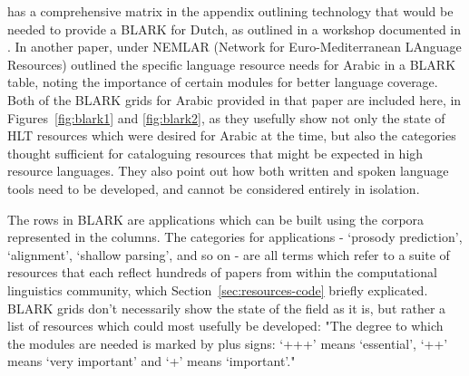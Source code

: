 \citet{krauwer2003basic} has a comprehensive matrix in the appendix outlining technology that would be needed to provide a BLARK for Dutch, as outlined in a workshop documented in \citet{binnenpoorte2002towards}. In another paper, \citet{maegaard2006blark} under NEMLAR (Network  for  Euro-Mediterranean  LAnguage  Resources) outlined the specific language resource needs for Arabic in a BLARK table, noting the importance of certain modules for better language coverage. Both of the BLARK grids for Arabic provided in that paper are included here, in Figures~\ref{fig:blark1} and \ref{fig:blark2}, as they usefully show not only the state of HLT resources which were desired for Arabic at the time, but also the categories thought sufficient for cataloguing resources that might be expected in high resource languages. They also point out how both written and spoken language tools need to be developed, and cannot be considered entirely in isolation. 

The rows in BLARK are applications which can be built using the corpora represented in the columns. The categories for applications - `prosody prediction', `alignment', `shallow parsing', and so on - are all terms which refer to a suite of resources that each reflect hundreds of papers from within the computational linguistics community, which Section~\ref{sec:resources-code} briefly explicated. BLARK grids don't necessarily show the state of the field as it is, but rather a list of resources which could most usefully be developed: "The degree to which the modules are needed is marked by plus signs: `+++' means `essential', `++' means `very important' and `+' means `important'." \citep[774]{maegaard2006blark}

